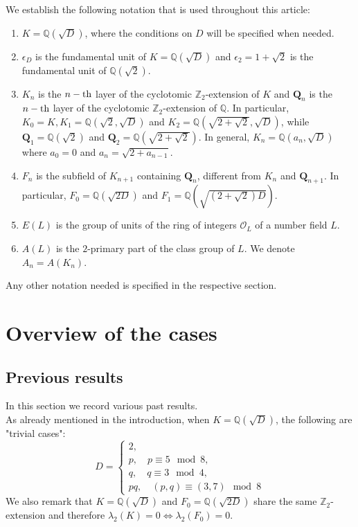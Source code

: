 \documentclass{article}
\numberwithin{equation}{section}
\theoremstyle{plain}  %
\theoremstyle{definition}
\newcommand{\Z}{\mathbb{Z}}
\newcommand{\Q}{\mathbb{Q}}
\newcommand{\ot}{\mathcal{O}}
\begin{document}
We establish the following notation that is used throughout this article:
\begin{enumerate}
    \item  $K=\Q (\sqrt{D})$, where the conditions on $D$ will be specified when needed. 
    \item $\epsilon_D$ is the fundamental unit of $K=\Q(\sqrt{D})$ and  $\epsilon_2=1+\sqrt{2}$ is the fundamental unit of $\Q(\sqrt{2})$.
    \item $K_n$ is the $n-\rm{th}$ layer of the cyclotomic $\Z_2$-extension of $K$ and $\mathbf{Q}_n$ is the $n-\rm{th}$ layer of the cyclotomic $\Z_2$-extension of $\Q$. In particular, $K_0 = K, K_1 = \Q(\sqrt{2}, \sqrt{D})$ and $K_{2}=\Q \left( \sqrt{2+\sqrt{2}},\sqrt{D}\right)$, while $\mathbf{Q}_{1} = \Q(\sqrt{2})$ and $\mathbf{Q}_2=\Q(\sqrt{2+\sqrt{2}})$. In general, $K_n=\Q(a_n, \sqrt{D})$ where $a_0=0$ and $a_n=\sqrt{2+a_{n-1}}$.
    \item $F_n$ is the subfield of $K_{n+1}$ containing $\mathbf{Q}_n$, different from $K_n$ and $\mathbf{Q}_{n+1}$. In particular, $F_0= \Q( \sqrt{2D})$ and $F_1=\Q(\sqrt{(2+\sqrt{2})D})$.
    \item $E(L)$ is the group of units of the ring of integers $\ot_L$ of a number field $L$.
    \item $A(L)$ is the $2$-primary part of the class group of $L$. We denote $A_n=A(K_n)$.
\end{enumerate}

Any other notation needed is specified in the respective section.

\section{Overview of the cases}

\subsection{Previous results}
In this section we record various past results. 
\\

As already mentioned in the introduction, when $K=\Q(\sqrt{D})$, the following are "trivial cases":  
$$D=\begin{cases}
    2,\\ 
    p, \quad p \equiv 5 \mod 8, \\ 
    q, \quad q\equiv 3 \mod 4, \\ 
    pq, \quad (p,q)\equiv (3,7) \mod 8
\end{cases}$$
We also remark that $K=\Q(\sqrt{D})$ and $F_0=\Q(\sqrt{2D})$ share the same $\Z_2$-extension and therefore $\lambda_2(K)=0 \iff \lambda_2(F_0)=0$.
\end{document}
